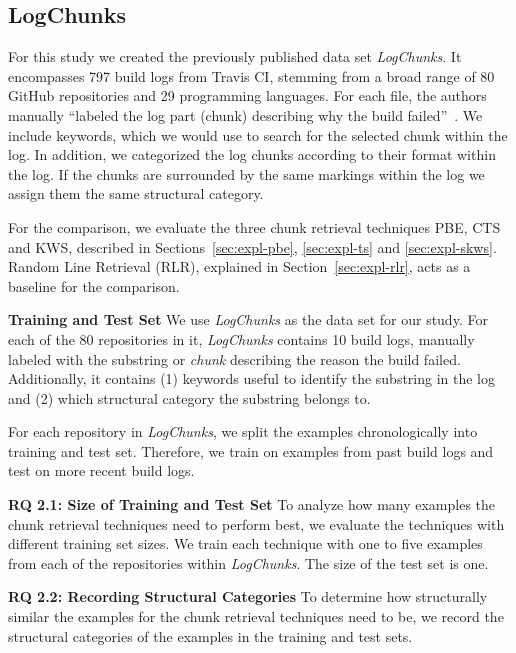 \subsection{LogChunks}
For this study we created the previously published data set
\emph{LogChunks}. It encompasses 797 build logs from Travis CI,
stemming from a broad range of 80 GitHub repositories and 29
programming languages. For each file, the authors manually ``labeled
the log part (chunk) describing why the build
failed''~\cite{brandt2020logchunks}. We include keywords, which we
would use to search for the selected chunk within the log. In
addition, we categorized the log chunks according to their format
within the log. If the chunks are surrounded by the same markings
within the log we assign them the same structural category.

For the comparison, we evaluate the three chunk retrieval techniques
PBE, CTS and KWS, described in Sections~\ref{sec:expl-pbe},
\ref{sec:expl-ts} and \ref{sec:expl-skws}. Random Line Retrieval
(RLR), explained in Section~\ref{sec:expl-rlr}, acts as a baseline for
the comparison.

\noindent
\textbf{Training and Test Set}
We use \emph{LogChunks} as the data set for our study. For each of the
80 repositories in it, \emph{LogChunks} contains 10 build logs,
manually labeled with the substring or \emph{chunk} describing the
reason the build failed. Additionally, it contains (1) keywords useful
to
identify the substring in the log  and (2) which structural category
the substring belongs to.

For each repository in \emph{LogChunks}, we split the examples
chronologically into training and test set. Therefore, we train on
examples from past build logs and test on more recent build logs.

\noindent
\textbf{RQ 2.1: Size of Training and Test Set}
To analyze how many examples the chunk retrieval techniques need to
perform best, we evaluate the techniques with different training set
sizes. We train each technique with one to five examples from each of
the repositories within \emph{LogChunks}. The size of the test set is
one.

\noindent
\textbf{RQ 2.2: Recording Structural Categories}
To determine how structurally similar the examples for the chunk
retrieval techniques need to be, we record the structural categories
of the examples in the training and test sets.

